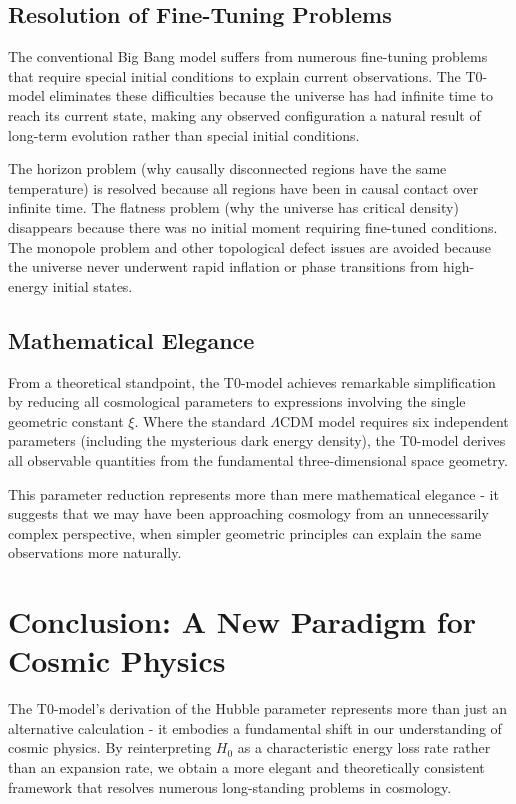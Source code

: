 \documentclass[12pt,a4paper]{article}
\begin{document}
	\subsection{Resolution of Fine-Tuning Problems}
	
	The conventional Big Bang model suffers from numerous fine-tuning problems that require special initial conditions to explain current observations. The T0-model eliminates these difficulties because the universe has had infinite time to reach its current state, making any observed configuration a natural result of long-term evolution rather than special initial conditions.
	
	The horizon problem (why causally disconnected regions have the same temperature) is resolved because all regions have been in causal contact over infinite time. The flatness problem (why the universe has critical density) disappears because there was no initial moment requiring fine-tuned conditions. The monopole problem and other topological defect issues are avoided because the universe never underwent rapid inflation or phase transitions from high-energy initial states.
	
	\subsection{Mathematical Elegance}
	
	From a theoretical standpoint, the T0-model achieves remarkable simplification by reducing all cosmological parameters to expressions involving the single geometric constant $\xi$. Where the standard $\Lambda$CDM model requires six independent parameters (including the mysterious dark energy density), the T0-model derives all observable quantities from the fundamental three-dimensional space geometry.
	
	This parameter reduction represents more than mere mathematical elegance - it suggests that we may have been approaching cosmology from an unnecessarily complex perspective, when simpler geometric principles can explain the same observations more naturally.
	

	\section{Conclusion: A New Paradigm for Cosmic Physics}
	
	The T0-model's derivation of the Hubble parameter represents more than just an alternative calculation - it embodies a fundamental shift in our understanding of cosmic physics. By reinterpreting $H_0$ as a characteristic energy loss rate rather than an expansion rate, we obtain a more elegant and theoretically consistent framework that resolves numerous long-standing problems in cosmology.
	
\end{document}
